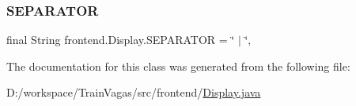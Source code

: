 \mbox{\label{classfrontend_1_1_display_a28290e54b617dbdaf5bfdb6c17a78e23}} 
\subsubsection{\texorpdfstring{S\+E\+P\+A\+R\+A\+T\+OR}{SEPARATOR}}
{\footnotesize\ttfamily final String frontend.\+Display.\+S\+E\+P\+A\+R\+A\+T\+OR = \char`\"{} $\vert$ \char`\"{}\hspace{0.3cm}{\ttfamily [static]}, {\ttfamily [package]}}



The documentation for this class was generated from the following file\+:\begin{DoxyCompactItemize}
\item 
D\+:/workspace/\+Train\+Vagas/src/frontend/\hyperlink{_display_8java}{Display.\+java}\end{DoxyCompactItemize}
